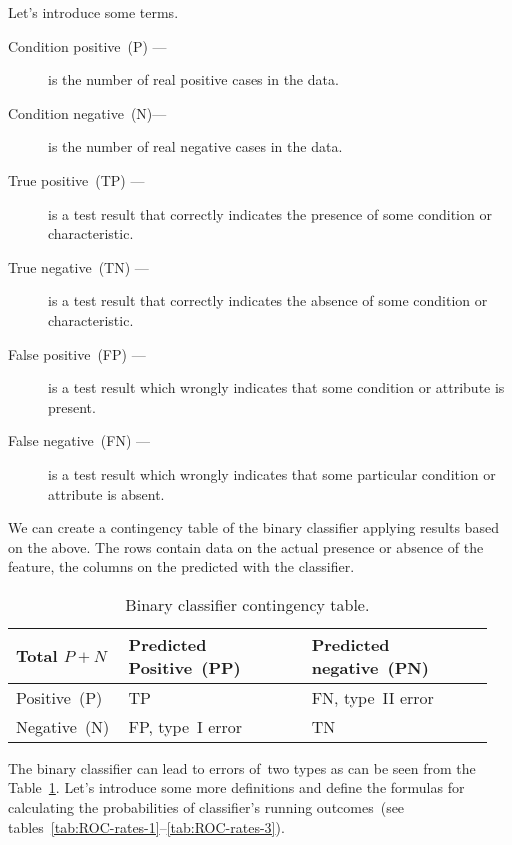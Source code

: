 \documentclass[]{scrreprt}
\begin{document}
Let's introduce some terms.
\begin{description}
	\item[Condition positive~(P) --- ] is the number of real positive cases in the data.
	\item[Condition negative~(N)---] is the number of real negative cases in the data.
	\item[True positive~(TP) ---] is a test result that correctly indicates the presence of some condition or characteristic.
	\item[True negative~(TN) ---] is a test result that correctly indicates the absence of some condition or characteristic.
	\item[False positive~(FP) ---] is a test result which wrongly indicates that some condition or attribute is present.
	\item[False negative~(FN) ---] is a test result which wrongly indicates that some particular condition or attribute is absent.
\end{description}
We can create a contingency table of the binary classifier applying results based on the above. The rows contain data on the actual presence or absence of the feature, the columns on the predicted with the classifier.
%
\begin{table}[htp]
	\caption{Binary classifier contingency table.}  \label{tab:ROC-contingency-table}
	\centering
	\begin{tabularx}{\textwidth}{p{0.2\linewidth} p{0.375\linewidth} p{0.375\linewidth}} 
		\hline
	Total $P+N$&Predicted Positive~(PP)&Predicted negative~(PN)\\
		\hline
		Positive~(P)&TP&FN, type~II error~\cite{Wiki:type-1-2-errors}\\
		\hline
		Negative~(N)&FP, type~I error~\cite{Wiki:type-1-2-errors}&TN\\
		\hline
	\end{tabularx}
\end{table}
%
The binary classifier can lead to errors of~two types as can be seen from the Table~\ref{tab:ROC-contingency-table}. Let's introduce some more definitions and define the formulas for calculating the probabilities of classifier's running outcomes~(see tables~\ref{tab:ROC-rates-1}--\ref{tab:ROC-rates-3}).
%
\end{document}
